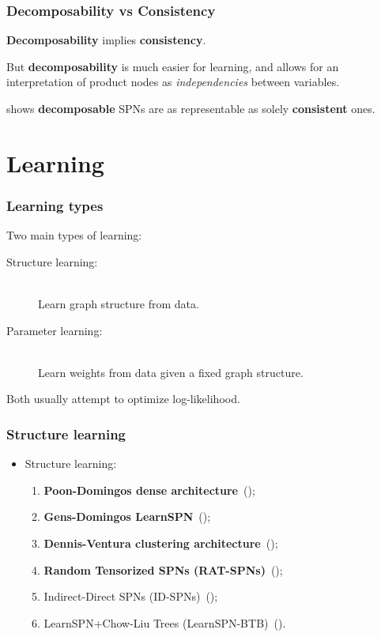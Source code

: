 \documentclass{beamer}
\begin{document}
\begin{frame}
  \frametitle{Decomposability vs Consistency}

  \textbf{Decomposability} implies \textbf{consistency}.
  \vfill

  But \textbf{decomposability} is much easier for learning, and allows for an interpretation of
  product nodes as \emph{independencies} between variables.
  \vfill

  \cite{theoretical-spn} shows \textbf{decomposable} SPNs are as representable as solely
  \textbf{consistent} ones.
\end{frame}


\section{Learning}

\begin{frame}
  \frametitle{Learning types}

  Two main types of learning:

  \begin{description}
    \item[Structure learning:]~\\
      Learn graph structure from data.
    \item[Parameter learning:]~\\
      Learn weights from data given a fixed graph structure.
  \end{description}

  Both usually attempt to optimize log-likelihood.

\end{frame}

\begin{frame}
  \frametitle{Structure learning}

  \begin{itemize}
    \item Structure learning:
      \begin{enumerate}
        \item \textbf{Poon-Domingos dense architecture}~(\cite{poon-domingos});
        \item \textbf{Gens-Domingos LearnSPN}~(\cite{gens-domingos});
        \item \textbf{Dennis-Ventura clustering architecture}~(\cite{clustering});
        \item \textbf{Random Tensorized SPNs (RAT-SPNs)}~(\cite{deep-learn-spn});
        \item Indirect-Direct SPNs (ID-SPNs)~(\cite{id-spn});
        \item LearnSPN+Chow-Liu Trees (LearnSPN-BTB)~(\cite{vergari-mauro}).
      \end{enumerate}
  \end{itemize}

\end{frame}
\end{document}
